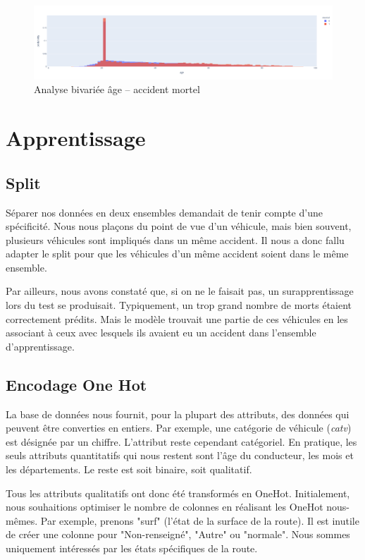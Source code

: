 \documentclass{article}
\begin{document}
    \begin{figure}[ht]
        \centering
        \includegraphics[width=14cm]{./img/bivar_age.png}
        \caption{Analyse bivariée âge -- accident mortel}\label{fig:fig_age_bivar}
    \end{figure}
    
    \section{Apprentissage}
    
    \subsection{Split}
    Séparer nos données en deux ensembles demandait de tenir compte d'une spécificité. Nous nous plaçons du point de vue d'un véhicule, 
    mais bien souvent, plusieurs véhicules sont impliqués dans un  même accident. Il nous a donc fallu adapter le split pour que les 
    véhicules d'un même accident soient dans le même ensemble. 
    
    Par ailleurs, nous avons constaté que, si on ne le faisait pas, un surapprentissage lors du test se produisait. Typiquement, un trop grand 
    nombre de morts étaient correctement prédits. Mais le modèle trouvait une partie de ces véhicules en les associant à ceux avec lesquels
    ils avaient eu un accident dans l'ensemble d'apprentissage. 
    
    \subsection{Encodage One Hot}
    La base de données nous fournit, pour la plupart des attributs, des données qui peuvent être converties en entiers. 
    Par exemple, une catégorie de véhicule (\textit{catv}) est désignée par un chiffre. L'attribut reste cependant catégoriel. En pratique, 
    les seuls attributs quantitatifs qui nous restent sont l'âge du conducteur, les mois et les départements. 
    Le reste est soit binaire, soit qualitatif. 
    
    Tous les attributs qualitatifs ont donc été transformés en OneHot. Initialement, nous souhaitions optimiser le nombre de colonnes en 
    réalisant les OneHot nous-mêmes. Par exemple, prenons "surf" (l'état de la surface de la route). Il est inutile de créer une colonne 
    pour "Non-renseigné", "Autre" ou "normale". Nous sommes uniquement intéressés par les états spécifiques de la route. 
    
\end{document}
